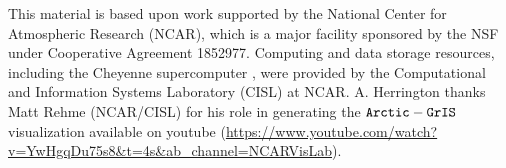 \documentclass[draft]{agujournal2019}
\begin{document}
%
%

%

%




%
%
%
%
%
%
%
%


\acknowledgments
    This material is based upon work supported by the National Center for Atmospheric Research (NCAR), which is a major facility sponsored by the NSF under Cooperative Agreement 1852977. Computing and data storage resources, including the Cheyenne supercomputer \cite{cheyenne}, were provided by the Computational and Information Systems Laboratory (CISL) at NCAR. A. Herrington thanks Matt Rehme (NCAR/CISL) for his role in generating the $\tt Arctic-GrIS$ visualization available on youtube ({\url{https://www.youtube.com/watch?v=YwHgqDu75s8&t=4s&ab_channel=NCARVisLab}}).
\end{document}

